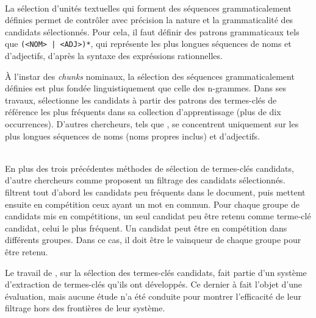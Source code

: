     \begin{example}
    \end{example}

    ~\\La sélection d'unités textuelles qui forment des séquences
    grammaticalement définies permet de contrôler
    avec précision la nature et la grammaticalité des candidats sélectionnés.
    Pour cela, il faut définir des patrons grammaticaux tels que \texttt{(<NOM>
    | <ADJ>)*}, qui représente les plus longues séquences de noms et
    d'adjectifs, d'après la syntaxe des expréssions rationnelles.

    À l'instar des \textit{chunks} nominaux, la sélection des séquences
    grammaticalement définies est plus fondée linguistiquement que celle des
    n-grammes. Dans ses travaux, 
    sélectionne les candidats à partir des patrons des termes-clés de référence
    les plus fréquents dans sa collection d'apprentissage (plus de dix
    occurrences). D'autres chercheurs, tels que , se
    concentrent uniquement sur les plus longues séquences de noms (noms propres
    inclus) et d'adjectifs.

    \begin{example}
    \end{example}

    ~\\En plus des trois précédentes méthodes de sélection de termes-clés
    candidats, d'autre chercheurs comme
     proposent un filtrage
    des candidats sélectionnés.
     filtrent tout d'abord
    les candidats peu fréquents dans le document, puis mettent ensuite en
    compétition ceux ayant un mot en commun. Pour chaque groupe de
    candidats mis en compétitions, un seul candidat peu être retenu comme
    terme-clé candidat, celui le plus fréquent. Un candidat peut être en
    compétition dans différents groupes. Dans ce cas, il doit être le
    \og{}vainqueur\fg{} de chaque groupe pour être retenu.

    Le travail de , sur la
    sélection des termes-clés candidats, fait partie d'un système d'extraction
    de termes-clés qu'ils ont développés. Ce dernier à fait l'objet d'une
    évaluation, mais aucune étude n'a été conduite pour montrer l'efficacité de
    leur filtrage hors des frontières de leur système.

